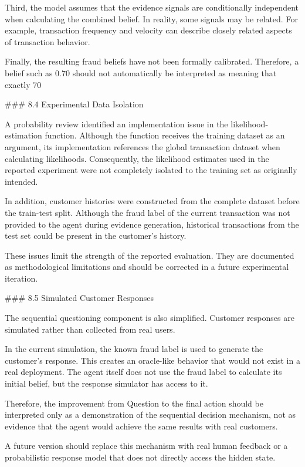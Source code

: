 Third, the model assumes that the evidence signals are conditionally independent when calculating the combined belief. In reality, some signals may be related. For example, transaction frequency and velocity can describe closely related aspects of transaction behavior.

Finally, the resulting fraud beliefs have not been formally calibrated. Therefore, a belief such as 0.70 should not automatically be interpreted as meaning that exactly 70%

### 8.4 Experimental Data Isolation

A probability review identified an implementation issue in the likelihood-estimation function. Although the function receives the training dataset as an argument, its implementation references the global transaction dataset when calculating likelihoods. Consequently, the likelihood estimates used in the reported experiment were not completely isolated to the training set as originally intended.

In addition, customer histories were constructed from the complete dataset before the train-test split. Although the fraud label of the current transaction was not provided to the agent during evidence generation, historical transactions from the test set could be present in the customer's history.

These issues limit the strength of the reported evaluation. They are documented as methodological limitations and should be corrected in a future experimental iteration.

### 8.5 Simulated Customer Responses

The sequential questioning component is also simplified. Customer responses are simulated rather than collected from real users.

In the current simulation, the known fraud label is used to generate the customer's response. This creates an oracle-like behavior that would not exist in a real deployment. The agent itself does not use the fraud label to calculate its initial belief, but the response simulator has access to it.

Therefore, the improvement from Question to the final action should be interpreted only as a demonstration of the sequential decision mechanism, not as evidence that the agent would achieve the same results with real customers.

A future version should replace this mechanism with real human feedback or a probabilistic response model that does not directly access the hidden state.

